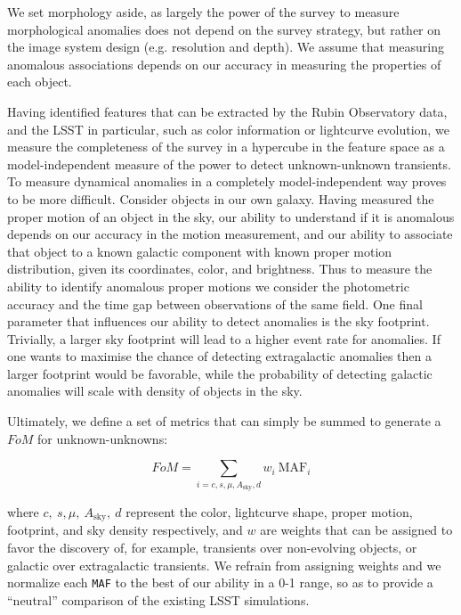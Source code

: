 \documentclass[onecolumn, 10pt]{aastex63}
\begin{document}
We set morphology aside, as largely the power of the survey to measure morphological anomalies does not depend on the survey strategy, but rather on the image system design (e.g. resolution and depth). We assume that measuring anomalous associations depends on our accuracy in measuring the properties of each object.

Having identified features that can be extracted by the Rubin Observatory data, and the LSST in particular, such as color information or lightcurve evolution, we measure the completeness of the survey in a hypercube in the feature space as a model-independent measure of the power to detect unknown-unknown transients.  
To measure dynamical anomalies in a completely model-independent way proves to be more difficult. Consider objects in our own galaxy. Having measured the proper motion of an object in the sky, our ability to understand if it is anomalous depends on  our accuracy in the motion measurement, and our ability to associate that object to a known galactic component with known proper motion distribution, given its coordinates, color, and brightness. Thus to measure the ability to identify anomalous proper motions we consider the photometric accuracy and the time gap between observations of the same field. One final parameter that influences our ability to detect anomalies is the sky footprint. Trivially, a larger sky footprint will lead to a higher event rate for anomalies. If one wants to maximise the chance of detecting extragalactic anomalies then a larger footprint would be favorable, while the probability of detecting galactic anomalies will scale with density of objects in the sky.

Ultimately, we define a set of metrics that can simply be summed to generate a $FoM$ for unknown-unknowns:

\begin{equation}
   FoM = \sum_{i={c,s,\mu,A_\mathrm{sky}, d }} w_i ~\mathrm{MAF}_i
\end{equation}

where $c, ~s, \mu,~ A_\mathrm{sky}, ~d$ represent the color, lightcurve shape, proper motion, footprint, and sky density respectively, and $w$ are weights that can be assigned to favor the discovery of, for example, transients over non-evolving objects, or galactic over extragalactic transients. We refrain from assigning weights and we normalize each \texttt{MAF} to the best of our ability in a 0-1 range, so as to provide a ``neutral'' comparison of the existing LSST simulations.
\end{document}
